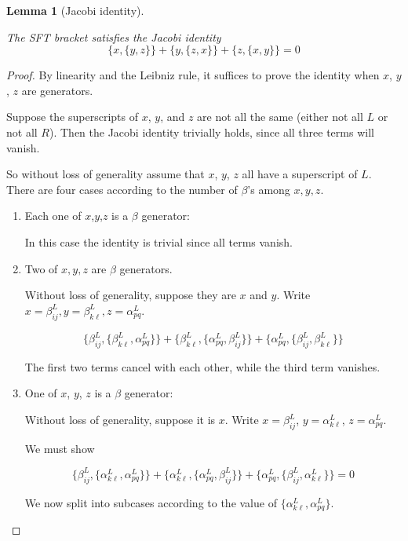 \documentclass[a4paper,final, reqno]{amsart}
\theoremstyle{plain}
\newtheorem{Lemma}[Th]{Lemma}
\theoremstyle{definition}
\begin{document}
	
	\begin{Lemma}[Jacobi identity] \label{lem:AMJac} \-\
		
		The SFT bracket satisfies the Jacobi identity 
		\[\{x,\{y,z\}\} + \{y,\{z,x\}\} + \{z,\{x,y\}\} = 0 \]
	\end{Lemma}
	\begin{proof}
		By linearity and the Leibniz rule, it suffices to prove the identity when $x$, $y$, $z$ are generators. 
		
		Suppose the superscripts of $x$, $y$, and $z$ are not all the same (either not all $L$ or not all $R$). Then the Jacobi identity trivially holds, since all three terms will vanish.
		
		So without loss of generality assume that $x$, $y$, $z$ all have a superscript of $L$. There are four cases according to the number of $\beta$'s among $x,y,z$. 
		
		\begin{enumerate}
			\item Each one of $x$,$y$,$z$ is a $\beta$ generator:
			
			In this case the identity is trivial since all terms vanish. \\
			
			\item Two of $x,y,z$ are $\beta$ generators.
			
			Without loss of generality, suppose they are $x$ and $y$. Write $x = \beta_{ij}^L, y = \beta_{k\ell}^L, z = \alpha_{pq}^L$. 
			
			
			\[ \{ \beta_{ij}^L, \{\beta_{k\ell}^L, \alpha_{pq}^L \}\} + \{ \beta_{k\ell}^L, \{\alpha_{pq}^L, \beta_{ij}^L \}\} + \{\alpha_{pq}^L , \{\beta_{ij}^L, \beta_{k\ell}^L \}\} \]
			
			The first two terms cancel with each other, while the third term vanishes.
			
			\item One of $x$, $y$, $z$ is a $\beta$ generator:
			
			Without loss of generality, suppose it is $x$. Write $x=\beta_{ij}^L$, $y=\alpha_{k\ell}^L$, $z=\alpha_{pq}^L$.
			
			We must show 
			
			\[ \{ \beta_{ij}^L, \{\alpha_{k\ell}^L, \alpha_{pq}^L \}\} + \{ \alpha_{k\ell}^L, \{\alpha_{pq}^L, \beta_{ij}^L \}\} + \{\alpha_{pq}^L , \{\beta_{ij}^L, \alpha_{k\ell}^L \}\} = 0 \]
			
						
			We now split into subcases according to the value of $\{\alpha_{k\ell}^L, \alpha_{pq}^L\}$. 
			

\end{enumerate}
\end{proof}
\end{document}
